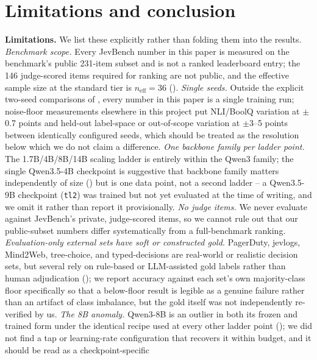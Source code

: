 \section{Limitations and conclusion}
\label{sec:limitations}

\textbf{Limitations.} We list these explicitly rather than folding them into the results.
\textit{Benchmark scope.} Every JevBench number in this paper is measured on the benchmark's public
231-item subset and is not a ranked leaderboard entry; the 146 judge-scored items required for ranking are
not public, and the effective sample size at the standard tier is $n_{\mathrm{eff}}{=}36$
(). \textit{Single seeds.} Outside the explicit two-seed comparisons of
, every number in this paper is a single training run; noise-floor measurements
elsewhere in this project put NLI/BoolQ variation at $\pm$0.7 points and held-out label-space or
out-of-scope variation at $\pm$3--5 points between identically configured seeds, which should be treated as
the resolution below which we do not claim a difference. \textit{One backbone family per ladder point.}
The 1.7B/4B/8B/14B scaling ladder is entirely within the Qwen3 family; the single Qwen3.5-4B checkpoint is
suggestive that backbone family matters independently of size () but is one
data point, not a second ladder -- a Qwen3.5-9B checkpoint (\texttt{tl2}) was trained but not yet evaluated
at the time of writing, and we omit it rather than report it provisionally. \textit{No judge items.} We
never evaluate against JevBench's private, judge-scored items, so we cannot rule out that our public-subset
numbers differ systematically from a full-benchmark ranking. \textit{Evaluation-only external sets have
soft or constructed gold.} PagerDuty, jevlogs, Mind2Web, tree-choice, and typed-decisions are real-world
or realistic decision sets, but several rely on rule-based or LLM-assisted gold labels rather than
human adjudication (); we report accuracy against each set's own
majority-class floor specifically so that a below-floor result is legible as a genuine failure rather than
an artifact of class imbalance, but the gold itself was not independently re-verified by us.
\textit{The 8B anomaly.} Qwen3-8B is an outlier in both its frozen and trained form under the identical
recipe used at every other ladder point (); we did not find a tap or
learning-rate configuration that recovers it within budget, and it should be read as a checkpoint-specific
